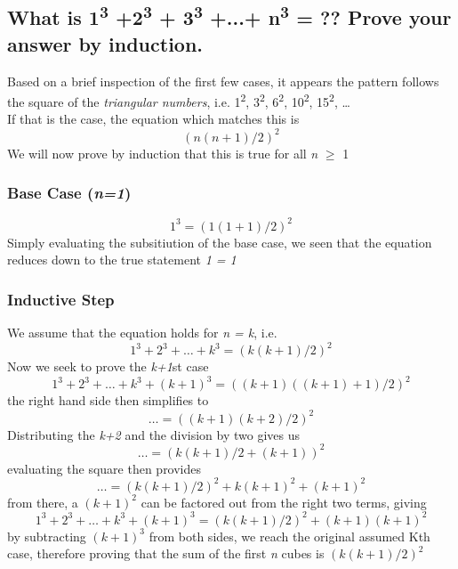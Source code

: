\documentclass[titlepage]{article}
\numberwithin{equation}{subsection}
\begin{document}
\subsection{What is 1\textsuperscript{3} +2\textsuperscript{3} + 3\textsuperscript{3} +...+ n\textsuperscript{3} = ?? Prove your answer by induction.}
Based on a brief inspection of the first few cases, it appears the pattern follows the square of the \textit{triangular numbers},
i.e. 1\textsuperscript{2}, 3\textsuperscript{2}, 6\textsuperscript{2}, 10\textsuperscript{2}, 15\textsuperscript{2}, \dots\\If that is the case, the equation which matches this is
\begin{equation}
    (n(n+1)/2)^2
\end{equation}
We will now prove by induction that this is true for all \textit{n} $\geq$ 1
\subsubsection{Base Case (\textit{n=1})}
\begin{equation}
    1^3 = (1(1+1)/2)^2
\end{equation}
Simply evaluating the subsitiution of the base case, we seen that the
equation reduces down to the true statement \textit{1 = 1}
\subsubsection{Inductive Step}
We assume that the equation holds for \textit{n = k}, i.e.
\begin{equation}
    1^3 + 2^3 + \dots + k^3 = (k(k+1)/2)^2
\end{equation}
Now we seek to prove the \textit{k+1}st case
\begin{equation}
    1^3 + 2^3 + \dots + k^3 + (k+1)^3 = ((k+1)((k+1)+1)/2)^2
\end{equation}
the right hand side then simplifies to
\begin{equation}
    \dots = ((k+1)(k+2)/2)^2
\end{equation}
Distributing the \textit{k+2} and the division by two gives us
\begin{equation}
    \dots = (k(k+1)/2+(k+1))^2
\end{equation}
evaluating the square then provides
\begin{equation}
    \dots = (k(k+1)/2)^2 + k(k+1)^2 + (k+1)^2
\end{equation}
from there, a $(k+1)^2$ can be factored out from
the right two terms, giving
\begin{equation}
    1^3 + 2^3 + \dots + k^3 + (k+1)^3 = (k(k+1)/2)^2 + (k+1)(k+1)^2
\end{equation}
by subtracting $(k+1)^3$ from both sides, we
reach the original assumed Kth case, therefore proving that the sum of
the first \textit{n} cubes is $(k(k+1)/2)^2$
\end{document}
